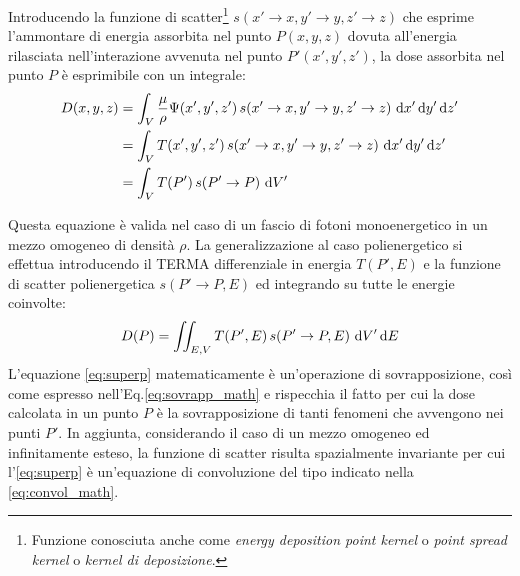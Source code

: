 {Introducendo la funzione di scatter\footnote{Funzione conosciuta anche come \textit{energy deposition point kernel} o \textit{point spread kernel} o \textit{kernel di deposizione}.} $s(x'\rightarrow x, y'\rightarrow y, z'\rightarrow z)$ che esprime l'ammontare di energia assorbita nel punto $P(x,y,z)$ dovuta all'energia rilasciata nell'interazione avvenuta nel punto $P'(x',y',z')$, la dose assorbita nel punto $P$ è esprimibile con un integrale:
\begin{align}
D(x,y,z) &=  \int_V \frac{\mu}{\rho} \Psi(x',y',z')\,s(x'\rightarrow x, y'\rightarrow y, z'\rightarrow z)\, \,\text{d} x' \,\text{d} y' \,\text{d} z'\\
         &= \int_V T(x',y',z')\,s(x'\rightarrow x, y'\rightarrow y, z'\rightarrow z)\, \,\text{d} x' \,\text{d} y' \,\text{d} z'\\
         &= \int_V T(P')\,s(P'\rightarrow P)\, \,\text{d} V'
\end{align}

Questa equazione è valida nel caso di un fascio di fotoni monoenergetico in un mezzo omogeneo di densità $\rho$. La generalizzazione al caso polienergetico si effettua introducendo il TERMA differenziale in energia $T(P',E)$ e la funzione di scatter polienergetica $s(P'\rightarrow P,E)$ ed integrando su tutte le energie coinvolte:
\begin{equation}
D(P) = \iint_{E,V} T(P',E)\,s(P'\rightarrow P,E)\, \,\text{d} V' \,\text{d} E
\label{eq:superp}
\end{equation}
L'equazione \eqref{eq:superp} matematicamente è un'operazione di sovrapposizione, così come espresso nell'Eq.\eqref{eq:sovrapp_math} e rispecchia il fatto per cui la dose calcolata in un punto $P$ è la sovrapposizione di tanti fenomeni che avvengono nei punti $P'$. In aggiunta, considerando il caso di un mezzo omogeneo ed infinitamente esteso, la funzione di scatter risulta spazialmente invariante per cui l'\eqref{eq:superp} è un'equazione di convoluzione del tipo indicato nella \eqref{eq:convol_math}.




}
